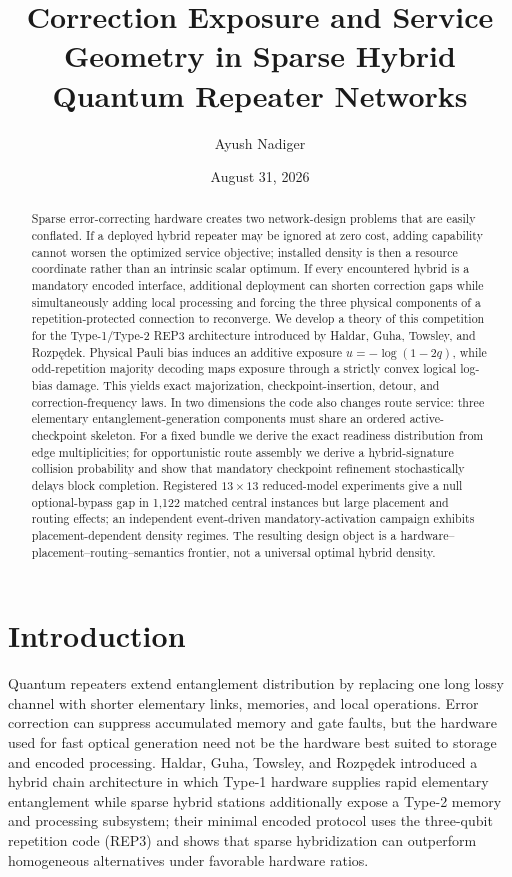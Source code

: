 \documentclass[aps,prx,reprint,superscriptaddress,nofootinbib,longbibliography,floatfix]{revtex4-2}
\begin{document}
\title{Correction Exposure and Service Geometry in Sparse Hybrid Quantum Repeater Networks}
\author{Ayush Nadiger}
\date{August 31, 2026}

\begin{abstract}
Sparse error-correcting hardware creates two network-design problems that are easily conflated. If a deployed hybrid repeater may be ignored at zero cost, adding capability cannot worsen the optimized service objective; installed density is then a resource coordinate rather than an intrinsic scalar optimum. If every encountered hybrid is a mandatory encoded interface, additional deployment can shorten correction gaps while simultaneously adding local processing and forcing the three physical components of a repetition-protected connection to reconverge. We develop a theory of this competition for the Type-1/Type-2 REP3 architecture introduced by Haldar, Guha, Towsley, and Rozp\k{e}dek. Physical Pauli bias induces an additive exposure $u=-\log(1-2q)$, while odd-repetition majority decoding maps exposure through a strictly convex logical log-bias damage. This yields exact majorization, checkpoint-insertion, detour, and correction-frequency laws. In two dimensions the code also changes route service: three elementary entanglement-generation components must share an ordered active-checkpoint skeleton. For a fixed bundle we derive the exact readiness distribution from edge multiplicities; for opportunistic route assembly we derive a hybrid-signature collision probability and show that mandatory checkpoint refinement stochastically delays block completion. Registered $13\times13$ reduced-model experiments give a null optional-bypass gap in 1,122 matched central instances but large placement and routing effects; an independent event-driven mandatory-activation campaign exhibits placement-dependent density regimes. The resulting design object is a hardware--placement--routing--semantics frontier, not a universal optimal hybrid density.
\end{abstract}
\maketitle

\section{Introduction}
Quantum repeaters extend entanglement distribution by replacing one long lossy channel with shorter elementary links, memories, and local operations. Error correction can suppress accumulated memory and gate faults, but the hardware used for fast optical generation need not be the hardware best suited to storage and encoded processing. Haldar, Guha, Towsley, and Rozp\k{e}dek introduced a hybrid chain architecture in which Type-1 hardware supplies rapid elementary entanglement while sparse hybrid stations additionally expose a Type-2 memory and processing subsystem; their minimal encoded protocol uses the three-qubit repetition code (REP3) and shows that sparse hybridization can outperform homogeneous alternatives under favorable hardware ratios.
\end{document}
